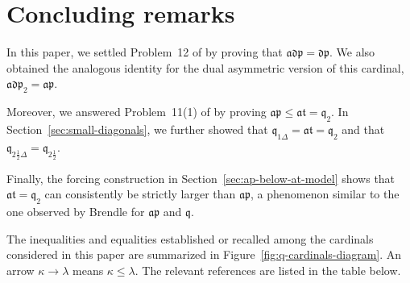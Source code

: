\section{Concluding remarks}

In this paper, we settled Problem~12 of \cite{banakh2023q} by proving that
$\mathfrak{adp}=\mathfrak{dp}$.
We also obtained the analogous identity for the dual asymmetric version of this
cardinal, $\mathfrak{adp}_2=\mathfrak{ap}$.

Moreover, we answered Problem~11(1) of
\cite{banakh2023q} by proving $\mathfrak{ap}\leq\mathfrak{at}= \mathfrak q_{2}$.
In Section~\ref{sec:small-diagonals}, we further showed that
$\mathfrak q_{1\Delta}=\mathfrak{at}=\mathfrak q_2$ and that
$\mathfrak q_{2\frac{1}{2}\Delta}=\mathfrak q_{2\frac{1}{2}}$.

Finally, the forcing construction in Section~\ref{sec:ap-below-at-model}
shows that $\mathfrak{at}=\mathfrak q_{2}$ can consistently be strictly larger than
$\mathfrak{ap}$, a phenomenon similar to the one observed by Brendle \cite{brendle1999dow} for $\mathfrak{ap}$ and $\mathfrak q$.

The inequalities and equalities established or recalled among the cardinals considered in
this paper are summarized in Figure~\ref{fig:q-cardinals-diagram}.  An arrow
$\kappa\to\lambda$ means $\kappa\leq\lambda$.
The relevant references are listed in the table below.

\begin{center}

\label{fig:q-cardinals-diagram}
\end{center}

